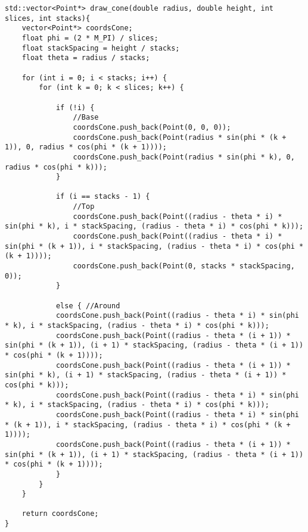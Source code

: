 \begin{lstlisting}
std::vector<Point*> draw_cone(double radius, double height, int slices, int stacks){
    vector<Point*> coordsCone;
    float phi = (2 * M_PI) / slices;
    float stackSpacing = height / stacks;
    float theta = radius / stacks;

    for (int i = 0; i < stacks; i++) {
        for (int k = 0; k < slices; k++) {

            if (!i) {
                //Base
                coordsCone.push_back(Point(0, 0, 0));
                coordsCone.push_back(Point(radius * sin(phi * (k + 1)), 0, radius * cos(phi * (k + 1))));
                coordsCone.push_back(Point(radius * sin(phi * k), 0, radius * cos(phi * k)));
            }

            if (i == stacks - 1) {
                //Top
                coordsCone.push_back(Point((radius - theta * i) * sin(phi * k), i * stackSpacing, (radius - theta * i) * cos(phi * k)));
                coordsCone.push_back(Point((radius - theta * i) * sin(phi * (k + 1)), i * stackSpacing, (radius - theta * i) * cos(phi * (k + 1))));
                coordsCone.push_back(Point(0, stacks * stackSpacing, 0));
            }

            else { //Around
            coordsCone.push_back(Point((radius - theta * i) * sin(phi * k), i * stackSpacing, (radius - theta * i) * cos(phi * k)));
            coordsCone.push_back(Point((radius - theta * (i + 1)) * sin(phi * (k + 1)), (i + 1) * stackSpacing, (radius - theta * (i + 1)) * cos(phi * (k + 1))));
            coordsCone.push_back(Point((radius - theta * (i + 1)) * sin(phi * k), (i + 1) * stackSpacing, (radius - theta * (i + 1)) * cos(phi * k)));
            coordsCone.push_back(Point((radius - theta * i) * sin(phi * k), i * stackSpacing, (radius - theta * i) * cos(phi * k)));
            coordsCone.push_back(Point((radius - theta * i) * sin(phi * (k + 1)), i * stackSpacing, (radius - theta * i) * cos(phi * (k + 1))));
            coordsCone.push_back(Point((radius - theta * (i + 1)) * sin(phi * (k + 1)), (i + 1) * stackSpacing, (radius - theta * (i + 1)) * cos(phi * (k + 1))));
            }
        }
    }

    return coordsCone;
}

\end{lstlisting}

